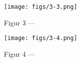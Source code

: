 \documentclass[a4paper, 12pt, oneside]{article}
\begin{document}
\vspace*{\fill}
\begin{figure}[H]
\centering
\texttt{[image: figs/3-3.png]}
\caption{\small Figur 3 --- }
\end{figure}
\vspace*{\fill}
\clearpage

\vspace*{\fill}
\begin{figure}[H]
\centering
\texttt{[image: figs/3-4.png]}
\caption{\small Figur 4 --- }
\end{figure}
\vspace*{\fill}
\clearpage
\end{document}
